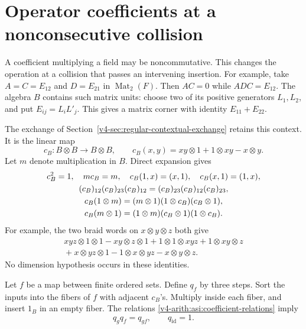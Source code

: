 \section{Operator coefficients at a nonconsecutive collision}

A coefficient multiplying a field may be noncommutative. This changes the
operation at a collision that passes an intervening insertion. For example,
take $A=C=E_{12}$ and $D=E_{21}$ in $\operatorname{Mat}_2(F)$. Then
$AC=0$ while $ADC=E_{12}$. The algebra $B$ contains such matrix units:
choose two of its positive generators $L_1,L_2$, and put
$E_{ij}=L_iL'_j$. This gives a matrix corner with identity $E_{11}+E_{22}$.

The exchange of Section~\ref{v4-sec:regular-contextual-exchange}
retains this context. It is the linear map
\begin{equation}\label{v4-arith:asi:contextual-crossing}
 c_B:B\otimes B\longrightarrow B\otimes B,\qquad
 c_B(x,y)=xy\otimes1+1\otimes xy-x\otimes y.
\end{equation}
Let $m$ denote multiplication in $B$. Direct expansion gives
\begin{gather}
 c_B^2=1,\quad mc_B=m,\quad
 c_B(1,x)=(x,1),\quad c_B(x,1)=(1,x),\notag\\
 (c_B)_{12}(c_B)_{23}(c_B)_{12}
 =(c_B)_{23}(c_B)_{12}(c_B)_{23},\label{v4-arith:asi:coefficient-relations}\\
 c_B(1\otimes m)=(m\otimes1)(1\otimes c_B)(c_B\otimes1),\notag\\
 c_B(m\otimes1)=(1\otimes m)(c_B\otimes1)(1\otimes c_B).\notag
\end{gather}
For example, the two braid words on $x\otimes y\otimes z$ both give
\begin{align*}
 xyz\otimes1\otimes1-xy\otimes z\otimes1+1\otimes1\otimes xyz
 +1\otimes xy\otimes z\\
 {}+x\otimes yz\otimes1-1\otimes x\otimes yz-x\otimes y\otimes z.
\end{align*}
No dimension hypothesis occurs in these identities.

Let $f$ be a map between finite ordered sets. Define $q_f$ by three steps.
Sort the inputs into the fibers of $f$ with adjacent $c_B$'s.
Multiply inside each fiber, and insert $1_B$ in an empty fiber. The relations
\eqref{v4-arith:asi:coefficient-relations} imply
\begin{equation}\label{v4-arith:asi:q-functor}
 q_gq_f=q_{gf},\qquad q_{\mathrm{id}}=1.
\end{equation}

